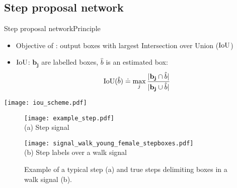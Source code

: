 \subsection{Step proposal network}



\begin{frame}{Step proposal network}{Principle}

\begin{minipage}{0.7\linewidth}
    \begin{itemize}
        \item Objective of \subalgo: output boxes with largest Intersection over Union ($\mathrm{IoU}$)
        \item $\mathrm{IoU}$: $\mathbf{b_j}$ are labelled boxes, $\hat{b}$ is an estimated box:
    \begin{equation*}\label{eq: def IOU}
    \mathrm{IoU}(\hat{b}) \doteq \max_{j} \frac{ \vert \mathbf{b_j} \cap \hat{b}\vert}{\vert \mathbf{b_j} \cup \hat{b}\vert}
    \end{equation*}
    \end{itemize}
\end{minipage}\hfill
\begin{minipage}{0.3\linewidth}
    \centering
    \texttt{[image: iou\_scheme.pdf]}
\end{minipage}

\pause

\begin{figure}[h]
    \centering
    \begin{minipage}[t]{0.45\linewidth}
        \centering
        \texttt{[image: example\_step.pdf]}\\
        {\small (a)\; Step signal}
    \end{minipage}\hfill
    \begin{minipage}[t]{0.55\linewidth}
        \centering
        \texttt{[image: signal\_walk\_young\_female\_stepboxes.pdf]}\\
        {\small (b)\; Step labels over a walk signal}
    \end{minipage}
    \caption{Example of a typical step (a) and true steps delimiting boxes in a walk signal (b).}
\end{figure}
\end{frame}

